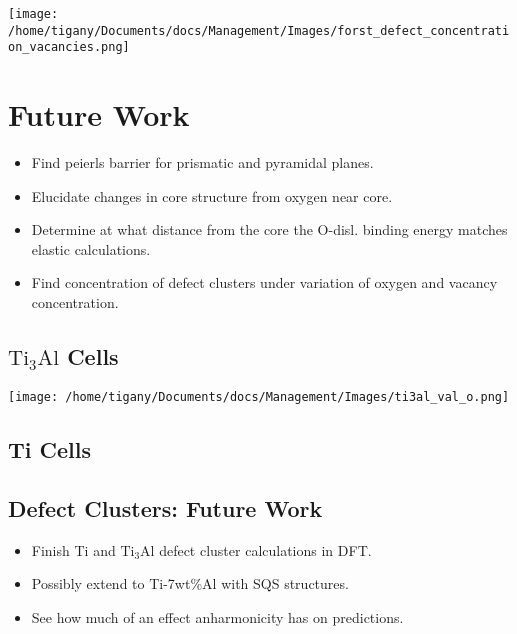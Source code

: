 \documentclass[11pt]{article}
\begin{document}
\begin{center}
\texttt{[image: /home/tigany/Documents/docs/Management/Images/forst\_defect\_concentration\_vacancies.png]}
\label{org6c22436}
\end{center}


\section*{Future Work}
\label{sec:orgae6cd09}

\begin{itemize}
\item Find peierls barrier for prismatic and pyramidal planes.
\item Elucidate changes in core structure from oxygen near core.
\item Determine at what distance from the core the O-disl. binding energy matches elastic calculations.
\item Find concentration of defect clusters under variation of oxygen and
vacancy concentration.
\end{itemize}

\subsection*{\(\text{Ti}_{3}\text{Al}\)  Cells}
\label{sec:org57103e7}
\begin{center}
\texttt{[image: /home/tigany/Documents/docs/Management/Images/ti3al\_val\_o.png]}
\label{orgbbeebc9}
\end{center}

\subsection*{Ti Cells}
\label{sec:org7e75343}


\subsection*{Defect Clusters: Future Work}
\label{sec:orge81b24d}
\begin{itemize}
\item Finish Ti and \(\text{Ti}_{3}\text{Al}\) defect cluster calculations in DFT.
\item Possibly extend to Ti-7wt\%Al with SQS structures.
\item See how much of an effect anharmonicity has on predictions.
\end{itemize}
\end{document}
